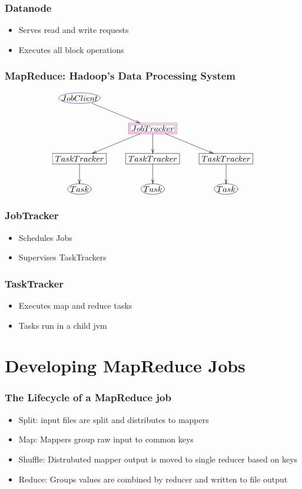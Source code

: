 \documentclass{beamer}
\begin{document}
\frame 
{
  \frametitle{Datanode}
  \begin{itemize}
    \item Serves read and write requests
    \item Executes all block operations
  \end{itemize}  
}


\frame
{
  \frametitle{MapReduce: Hadoop's Data Processing System}
  \begin{displaymath}
    \xymatrix{ 
      *+[Fe:blue]{JobClient} \ar[dr] & & \\
      & *+[F=:magenta]{JobTracker} \ar[dl] \ar[d] \ar[dr] \\
      *+[F]{TaskTracker} \ar[d] & *+[F]{TaskTracker} \ar[d] & *+[F]{TaskTracker} \ar[d] \\
      *+[Fe]{Task} & *+[Fe]{Task} & *+[Fe]{Task}
    }
  \end{displaymath}
}


\frame 
{
  \frametitle{JobTracker}
  \begin{itemize}
    \item Schedules Jobs
    \item Supervises TaskTrackers
  \end{itemize}
}

\frame 
{
  \frametitle{TaskTracker}
  \begin{itemize}
    \item Executes map and reduce tasks
    \item Tasks run in a child jvm
  \end{itemize}
}

\section{Developing MapReduce Jobs}

\frame
{
  \frametitle{The Lifecycle of a MapReduce job}
  \begin{itemize}
    \item Split: input files are split and distributes to mappers
    \item Map: Mappers group raw input to common keys
    \item Shuffle: Distrubuted mapper output is moved to single reducer based on
      keys
    \item Reduce: Groups values are combined by reducer and written to file
      output
  \end{itemize}
}
\end{document}
